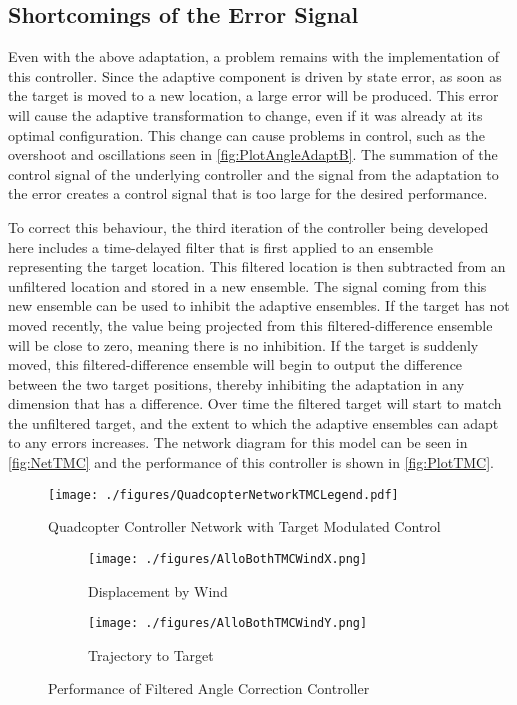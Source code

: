 \documentclass[letterpaper,12pt,titlepage,oneside,final]{book}
\begin{document}
\subsection{Shortcomings of the Error Signal}

Even with the above adaptation, a problem remains with the implementation of this controller. 
Since the adaptive component is driven by state error, as soon as the target is moved to a new location, a large error will be produced. 
This error will cause the adaptive transformation to change, even if it was already at its optimal configuration. 
This change can cause problems in control, such as the overshoot and oscillations seen in \autoref{fig:PlotAngleAdaptB}. 
The summation of the control signal of the underlying controller and the signal from the adaptation to the error creates a control signal that is too large for the desired performance.

To correct this behaviour, the third iteration of the controller being developed here includes a time-delayed filter that is first applied to an ensemble representing the target location. 
This filtered location is then subtracted from an unfiltered location and stored in a new ensemble. 
The signal coming from this new ensemble can be used to inhibit the adaptive ensembles. 
If the target has not moved recently, the value being projected from this filtered-difference ensemble will be close to zero, meaning there is no inhibition. 
If the target is suddenly moved, this filtered-difference ensemble will begin to output the difference between the two target positions, thereby inhibiting the adaptation in any dimension that has a difference. 
Over time the filtered target will start to match the unfiltered target, and the extent to which the adaptive ensembles can adapt to any errors increases. 
The network diagram for this model can be seen in \autoref{fig:NetTMC} and the performance of this controller is shown in \autoref{fig:PlotTMC}.

\begin{figure}
\centering
\texttt{[image: ./figures/QuadcopterNetworkTMCLegend.pdf]} %
\caption{Quadcopter Controller Network with Target Modulated Control} %
\label{fig:NetTMC}
\end{figure}

\begin{figure}
\centering
\begin{subfigure}[t]{0.48\textwidth}
\texttt{[image: ./figures/AlloBothTMCWindX.png]} %
\caption{Displacement by Wind}
\end{subfigure}
\begin{subfigure}[t]{0.48\textwidth}
\texttt{[image: ./figures/AlloBothTMCWindY.png]}
\caption{Trajectory to Target}
\end{subfigure}
\caption{Performance of Filtered Angle Correction Controller}
\label{fig:PlotTMC}
\end{figure}
\end{document}
